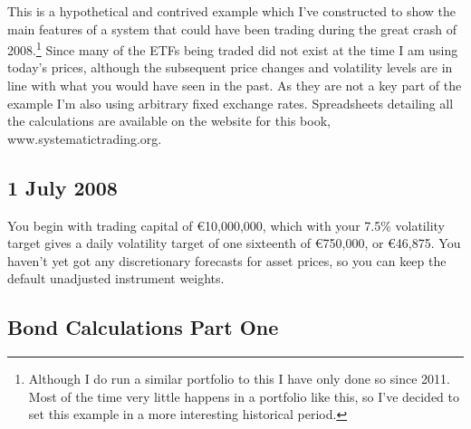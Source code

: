This is a hypothetical and contrived example which I've constructed to show the main features of a system that could have been trading during the great crash of 2008.\footnote{Although I do run a similar portfolio to this I have only done so since 2011. Most of the time very little happens in a portfolio like this, so I've decided to set this example in a more interesting historical period.} Since many of the ETFs being traded did not exist at the time I am using today's prices, although the subsequent price changes and volatility levels are in line with what you would have seen in the past. As they are not a key part of the example I'm also using arbitrary fixed exchange rates. Spreadsheets detailing all the calculations are available on the website for this book, www.systematictrading.org.

\subsection*{1 July 2008}

You begin with trading capital of €10,000,000, which with your 7.5\% volatility target gives a daily volatility target of one sixteenth of €750,000, or €46,875. You haven't yet got any discretionary forecasts for asset prices, so you can keep the default unadjusted instrument weights.

\subsection*{Bond Calculations Part One}


